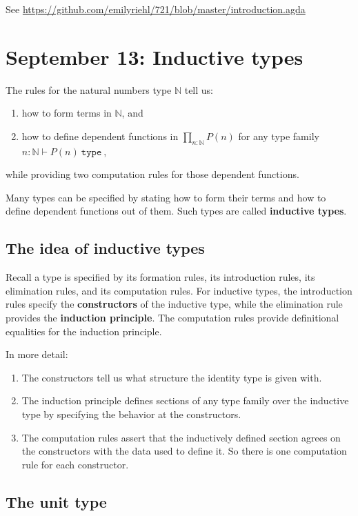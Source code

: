 \documentclass{amsart}
\theoremstyle{theorem}
\theoremstyle{definition}
\theoremstyle{remark}
\newcommand{\0}{\mathbbe{0}}
\newcommand{\1}{\mathbbe{1}}
\newcommand{\2}{\mathbbe{2}}
\newcommand{\3}{\mathbbe{3}}
\newcommand{\4}{\mathbbe{4}}
\newcommand{\univ}{{~\texttt{type}~}}
\newcommand{\bN}{{\mathbb{N}}}
\begin{document}
See \url{https://github.com/emilyriehl/721/blob/master/introduction.agda}


\section*{September 13: Inductive types}

The rules for the natural numbers type $\bN$ tell us:
\begin{enumerate}
\item how to form terms in $\bN$, and
\item how to define dependent functions in $\prod_{n : \bN} P(n)$ for any type family $n : \bN \vdash P(n) \univ$,
\end{enumerate}
while providing two computation rules for those dependent functions.

Many types can be specified by stating how to form their terms and how to define dependent functions out of them. Such types are called \textbf{inductive types}. 

\subsection*{The idea of inductive types}

Recall a type is specified by its formation rules, its introduction rules, its elimination rules, and its computation rules. For inductive types, the introduction rules specify the \textbf{constructors} of the inductive type, while the elimination rule provides the \textbf{induction principle}. The computation rules provide definitional equalities for the induction principle.

In more detail:
\begin{enumerate}
\item The constructors tell us what structure the identity type is given with.
\item The induction principle defines sections of any type family over the inductive type by specifying the behavior at the constructors.
\item The computation rules assert that the inductively defined section agrees on the constructors with the data used to define it. So there is one computation rule for each constructor.
\end{enumerate}

\subsection*{The unit type}
\end{document}
